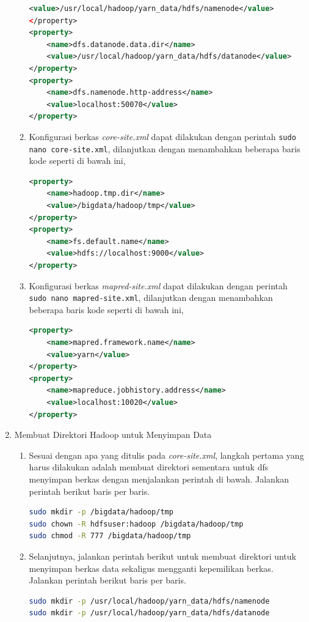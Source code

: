 \begin{enumerate}
\begin{enumerate}
\begin{lstlisting}[language=XML]
	<value>/usr/local/hadoop/yarn_data/hdfs/namenode</value>
</property>
<property>
	<name>dfs.datanode.data.dir</name>
	<value>/usr/local/hadoop/yarn_data/hdfs/datanode</value>
</property>
<property>
	<name>dfs.namenode.http-address</name>
	<value>localhost:50070</value>
</property>
      \end{lstlisting}
    \item Konfigurasi berkas \textit{core-site.xml} dapat dilakukan dengan perintah \verb|sudo nano core-site.xml|, dilanjutkan dengan menambahkan beberapa baris kode seperti di bawah ini,
       \begin{lstlisting}[language=XML]
<property>
	<name>hadoop.tmp.dir</name>
	<value>/bigdata/hadoop/tmp</value>
</property>
<property>
	<name>fs.default.name</name>
	<value>hdfs://localhost:9000</value>
</property>
      \end{lstlisting}
    \item Konfigurasi berkas \textit{mapred-site.xml} dapat dilakukan dengan perintah \verb|sudo nano mapred-site.xml|, dilanjutkan dengan menambahkan beberapa baris kode seperti di bawah ini,
       \begin{lstlisting}[language=XML]
<property>
	<name>mapred.framework.name</name>
	<value>yarn</value>
</property>
<property>
	<name>mapreduce.jobhistory.address</name>
	<value>localhost:10020</value>
</property>
      \end{lstlisting}
  \end{enumerate}
  \item Membuat Direktori Hadoop untuk Menyimpan Data
  \begin{enumerate}
    \item Sesuai dengan apa yang ditulis pada \textit{core-site.xml}, langkah pertama yang harus dilakukan adalah membuat direktori sementara untuk dfs menyimpan berkas dengan menjalankan perintah di bawah. Jalankan perintah berikut baris per baris.
       \begin{lstlisting}[language=bash]
sudo mkdir -p /bigdata/hadoop/tmp
sudo chown -R hdfsuser:hadoop /bigdata/hadoop/tmp
sudo chmod -R 777 /bigdata/hadoop/tmp
      \end{lstlisting}
    \item Selanjutnya, jalankan perintah berikut untuk membuat direktori untuk menyimpan berkas data sekaligus mengganti kepemilikan berkas. Jalankan perintah berikut baris per baris.
       \begin{lstlisting}[language=bash]
sudo mkdir -p /usr/local/hadoop/yarn_data/hdfs/namenode
sudo mkdir -p /usr/local/hadoop/yarn_data/hdfs/datanode

\end{lstlisting}
\end{enumerate}
\end{enumerate}
